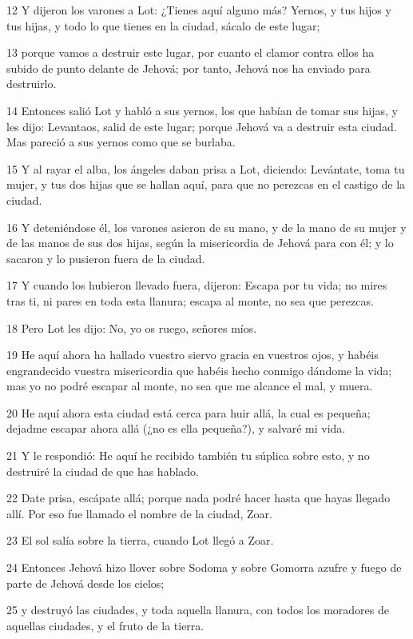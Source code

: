 \par 12 Y dijeron los varones a Lot: ¿Tienes aquí alguno más? Yernos, y tus hijos y tus hijas, y todo lo que tienes en la ciudad, sácalo de este lugar;
\par 13 porque vamos a destruir este lugar, por cuanto el clamor contra ellos ha subido de punto delante de Jehová; por tanto, Jehová nos ha enviado para destruirlo.
\par 14 Entonces salió Lot y habló a sus yernos, los que habían de tomar sus hijas, y les dijo: Levantaos, salid de este lugar; porque Jehová va a destruir esta ciudad. Mas pareció a sus yernos como que se burlaba.
\par 15 Y al rayar el alba, los ángeles daban prisa a Lot, diciendo: Levántate, toma tu mujer, y tus dos hijas que se hallan aquí, para que no perezcas en el castigo de la ciudad.
\par 16 Y deteniéndose él, los varones asieron de su mano, y de la mano de su mujer y de las manos de sus dos hijas, según la misericordia de Jehová para con él; y lo sacaron y lo pusieron fuera de la ciudad.
\par 17 Y cuando los hubieron llevado fuera, dijeron: Escapa por tu vida; no mires tras ti, ni pares en toda esta llanura; escapa al monte, no sea que perezcas.
\par 18 Pero Lot les dijo: No, yo os ruego, señores míos.
\par 19 He aquí ahora ha hallado vuestro siervo gracia en vuestros ojos, y habéis engrandecido vuestra misericordia que habéis hecho conmigo dándome la vida; mas yo no podré escapar al monte, no sea que me alcance el mal, y muera.
\par 20 He aquí ahora esta ciudad está cerca para huir allá, la cual es pequeña; dejadme escapar ahora allá (¿no es ella pequeña?), y salvaré mi vida.
\par 21 Y le respondió: He aquí he recibido también tu súplica sobre esto, y no destruiré la ciudad de que has hablado.
\par 22 Date prisa, escápate allá; porque nada podré hacer hasta que hayas llegado allí. Por eso fue llamado el nombre de la ciudad, Zoar.
\par 23 El sol salía sobre la tierra, cuando Lot llegó a Zoar.
\par 24 Entonces Jehová hizo llover sobre Sodoma y sobre Gomorra azufre y fuego de parte de Jehová desde los cielos;
\par 25 y destruyó las ciudades, y toda aquella llanura, con todos los moradores de aquellas ciudades, y el fruto de la tierra.
